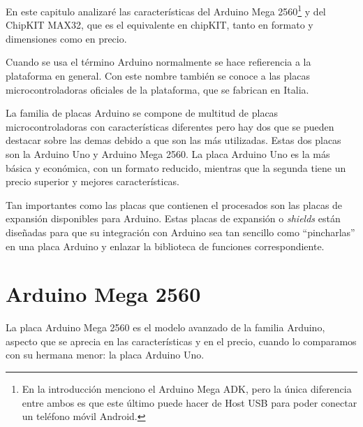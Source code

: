 


En este capitulo analizaré las características del Arduino Mega 2560\footnote{En la introducción menciono el Arduino Mega ADK, pero la única diferencia entre ambos es que este último puede hacer de Host USB para poder conectar un teléfono móvil Android.} y del ChipKIT MAX32, que es el equivalente en chipKIT, tanto en formato y dimensiones como en precio.


Cuando se usa el término Arduino normalmente se hace refierencia a la plataforma en general. Con este nombre también se conoce a las placas microcontroladoras oficiales de la plataforma, que se fabrican en Italia.

La familia de placas Arduino se compone de multitud de placas microcontroladoras con características diferentes pero hay dos que se pueden destacar sobre las demas debido a que son las más utilizadas.  Estas dos placas son la Arduino Uno y Arduino Mega 2560. La placa Arduino Uno es la más básica y económica, con un formato reducido, mientras que la segunda tiene un precio superior y mejores características.

Tan importantes como las placas que contienen el procesados son las placas de expansión disponibles para Arduino. Estas placas de expansión o \textit{shields} están diseñadas para que su integración con Arduino sea tan sencillo como \textquotedblleft pincharlas\textquotedblright{}  en una placa Arduino y enlazar la biblioteca de funciones correspondiente.

\section{Arduino Mega 2560}
La placa Arduino Mega 2560 es el modelo avanzado de la familia Arduino, aspecto que se aprecia en las características y en el precio, cuando lo comparamos con su hermana menor: la placa Arduino Uno.

